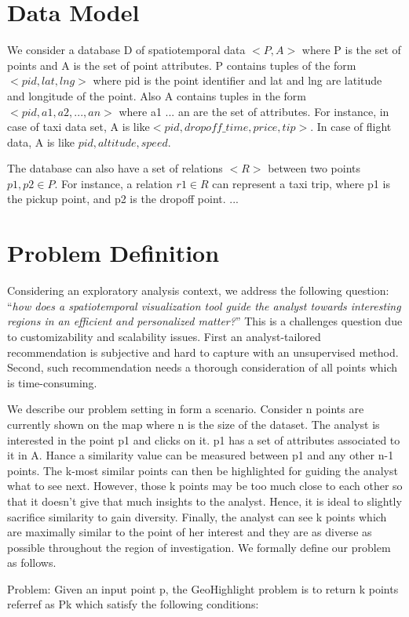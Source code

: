\documentclass{sig-alternate-05-2015}
\begin{document}
\section{Data Model}
We consider a database D of spatiotemporal data $<P,A>$ where P is the set of points and A is the set of point attributes. P contains tuples of the form $<pid, lat, lng>$ where pid is the point identifier and lat and lng are latitude and longitude of the point. Also A contains tuples in the form $<pid, a1, a2,..., an>$ where a1 ... 
an are the set of attributes. For instance, in case of taxi data set, A is like$< pid, dropoff\_time, price, tip>$. In case of flight data, A is like $pid, altitude, speed$.

The database can also have a set of relations $<R>$ between two points $p1,p2 \in P$. For instance,  a relation $r1 \in R$ can represent a taxi trip, where p1 is the pickup point, and p2 is the dropoff point. 
...
\section{Problem Definition}

Considering an exploratory analysis context, we address the following question: ``\textit{how does a spatiotemporal visualization tool guide the analyst towards interesting regions in an efficient and personalized matter?}'' This is a challenges question due to customizability and scalability issues. First an analyst-tailored recommendation is subjective and hard to capture with an unsupervised method. Second, such recommendation needs a thorough consideration of all points which is time-consuming.

We describe our problem setting in form a scenario. Consider n points are currently shown on the map where n is the size of the dataset. The analyst is interested in the point p1 and clicks on it. p1 has a set of attributes associated to it in A. Hance a similarity value can be measured between p1 and any other n-1 points. The k-most similar points can then be highlighted for guiding the analyst what to see next. However, those k points may be too much close to each other so that it doesn’t give that much insights to the analyst. Hence, it is ideal to slightly sacrifice similarity to gain diversity. Finally, the analyst can see k points which are maximally similar to the point of her interest and they are as diverse as possible throughout the region of investigation. We formally define our problem as follows.

Problem: Given an input point p, the GeoHighlight problem is to return k points referref as Pk which satisfy the following conditions:
\end{document}
